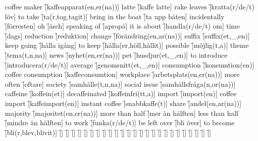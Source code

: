 \begin{questions}
    \begin{multicols}{2}
        \raggedcolumns
        \question coffee maker \f[kaffeapparat(en,er(na))]
        \question latte \f[kaffe latte]
        \question rake leaves \f[kratta(r/de/t) löv]
        \question to take \f[ta(r,tog,tagit)]
        \question bring in the boat \f[ta upp båten]
        \question incidentally \f[förresten]
        \question oh \f[äsch]
        \question speaking of \f[apropå]
        \question it is about \f[handla(r/de/t) om]
        \question time \f[dags]
        \question reduction \f[reduktion]
        \question change \f[förändring(en,ar(na))]
        \question suffix \f[suffix(et,\_,en)]
        \question keep going \f[hålla igång]
        \question to keep \f[hålla(er,höll,hållit)]
        \question possible \f[möjlig(t,a)]
        \question theme \f[tema(t,n,na)]
        \question news \f[nyhet(en,er(na))]
        \question pet \f[husdjur(et,\_,en)]
        \question to introduce \f[introducera(r/de/t)]
        \question average \f[genomsnitt(et,\_,en)]
        \question consumption \f[konsumtion(en)]
        \question coffee consumption \f[kaffeconsumtion]
        \question workplace \f[arbetsplats(en,er(na))]
        \question more often \f[oftare]
        \question society \f[samhälle(t,n,na)]
        \question social issue \f[samhällsfråga(n,or(na))]
        \question caffeine \f[koffein(et)]
        \question decaffeinated \f[koffeinfri(tt,a)]
        \question import \f[import(en)]
        \question coffee import \f[kaffeimport(en)]
        \question instant coffee \f[snabbkaffe(t)]
        \question share \f[andel(en,ar(na))]
        \question majority \f[majoritet(en,er(na))]
        \question more than half \f[mer än hälften]
        \question less than half \f[mindre än hälften]
        \question to work \f[funka(r/de/t)]
        \question be left over \f[bli över]
        \question to become \f[bli(r,blev,blivit)]
        \question  \f[]
        \question  \f[]
        \question  \f[]
        \question  \f[]
        \question  \f[]
        \question  \f[]
        \question  \f[]
        \question  \f[]
        \question  \f[]
        \question  \f[]
        \question  \f[]
        \question  \f[]
        \question  \f[]
        \question  \f[]
        \question  \f[]
        \question  \f[]
        \question  \f[]
        \question  \f[]
        \question  \f[]
        \question  \f[]
        \question  \f[]
        \question  \f[]
        \question  \f[]
        \question  \f[]
        \question  \f[]

\end{multicols}
\end{questions}

